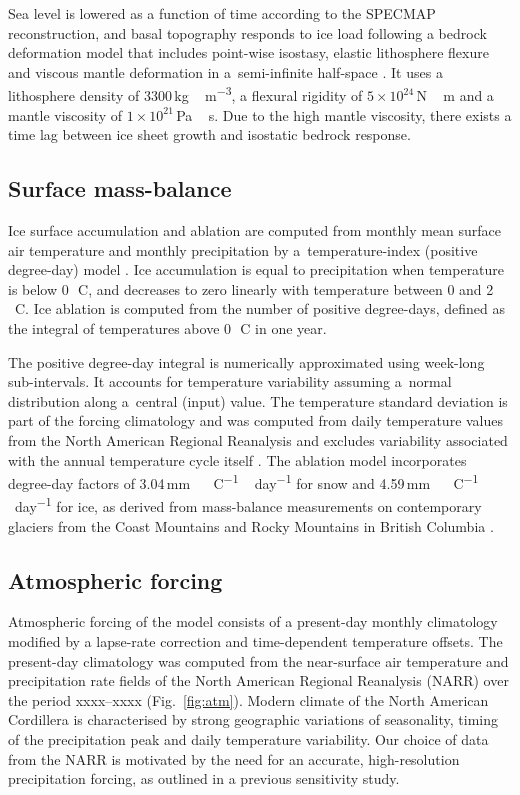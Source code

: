 Sea level is lowered as a function of time according to the SPECMAP
reconstruction, and basal topography responds to ice load
following a bedrock deformation model that includes point-wise isostasy,
elastic lithosphere flexure and viscous mantle deformation in a~semi-infinite
half-space \citep{lingle-clark-1985,bueler-etal-2007}. It uses a lithosphere
density of 3300\,\unit{kg\,m^{-3}}, a flexural rigidity of $5 \times
10^{24}$\,\unit{N\,m} and a mantle viscosity of $1 \times
10^{21}$\,\unit{Pa\,s}. Due to the high mantle viscosity, there exists a time
lag between ice sheet growth and isostatic bedrock response.

\subsection{Surface mass-balance}

Ice surface accumulation and ablation are computed from monthly mean surface
air temperature and monthly precipitation by a~temperature-index (positive
degree-day) model \citep{hock-2003}. Ice accumulation is equal to precipitation
when temperature is below 0\,\unit{{\degree}C}, and decreases to zero linearly
with temperature between 0 and 2\,\unit{{\degree}C}. Ice ablation is computed
from the number of positive degree-days, defined as the integral of
temperatures above 0\,\unit{{\degree}C} in one year.

The positive degree-day integral \citep{calov-greve-2005} is numerically
approximated using week-long sub-intervals. It accounts for temperature
variability assuming a~normal distribution along a~central (input) value. The
temperature standard deviation is part of the forcing climatology and was
computed from daily temperature values from the North American Regional
Reanalysis \citep{data:narr} and excludes variability associated with the annual
temperature cycle itself  \citet{seguinot-rogozhina-2014}. The
ablation model incorporates degree-day factors of
3.04\,\unit{mm\,{\degree}C^{-1}\,day^{-1}} for snow and
4.59\,\unit{mm\,{\degree}C^{-1}\,day^{-1}} for ice, as derived from
mass-balance measurements on contemporary glaciers from the Coast Mountains and
Rocky Mountains in British Columbia \citep{shea-etal-2009}.

\subsection{Atmospheric forcing}

Atmospheric forcing of the model consists of a present-day monthly climatology
modified by a lapse-rate correction and time-dependent temperature offsets. The
present-day climatology was computed from the near-surface air temperature and
precipitation rate fields of the North American Regional Reanalysis (NARR) over
the period xxxx--xxxx (Fig.~\ref{fig:atm}). Modern climate of the North
American Cordillera is characterised by strong geographic variations of
seasonality, timing of the precipitation peak and daily temperature variability.
Our choice of data from the NARR is motivated by the need for an accurate,
high-resolution precipitation forcing, as outlined in a previous sensitivity
study.

